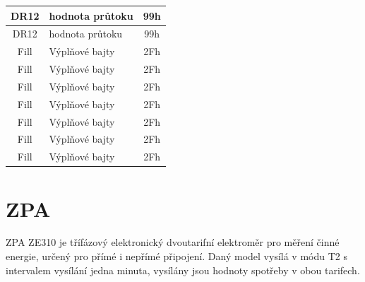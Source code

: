 \begin{table}[!ht]
\begin{tabular}{|c|l|c|}
DR12               & hodnota průtoku       & 99h \\ \hline
DR12               & hodnota průtoku       & 99h \\ \hline
Fill               & Výplňové bajty         & 2Fh \\ \hline
Fill               & Výplňové bajty         & 2Fh \\ \hline
Fill               & Výplňové bajty         & 2Fh \\ \hline
Fill               & Výplňové bajty         & 2Fh \\ \hline
Fill               & Výplňové bajty         & 2Fh \\ \hline
Fill               & Výplňové bajty         & 2Fh \\ \hline
Fill               & Výplňové bajty         & 2Fh \\ \hline \hline
\end{tabular}%
\end{table}

\newpage
	
	
	\section{ZPA}

ZPA ZE310 je třífázový elektronický dvoutarifní elektroměr pro měření činné energie, určený pro přímé i nepřímé připojení. Daný model vysílá v módu T2 s intervalem vysílání jedna minuta, vysílány jsou hodnoty spotřeby v obou tarifech.

